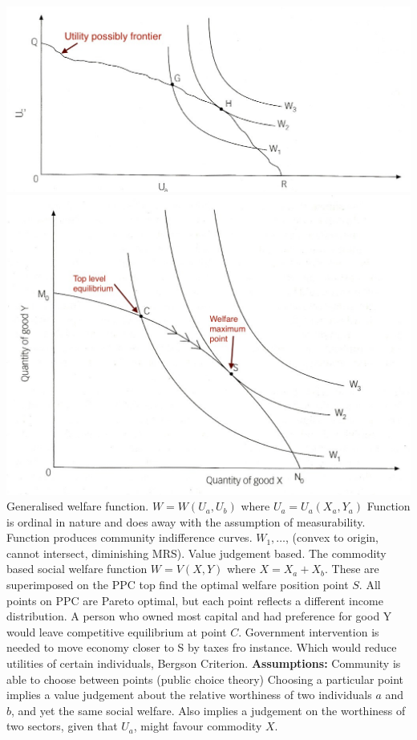 \documentclass[12pt]{examnotes}
\begin{document}
\includegraphics[scale=0.25]{./imgs/52.jpg}\includegraphics[scale=0.25]{./imgs/54.jpg}
\ra Generalised welfare function. $W=W(U_a,U_b)$ where $U_a=U_a(X_a,Y_a)$
\ra Function is ordinal in nature and does away with the assumption of measurability.
\ra Function produces community indifference curves. $W_1, \dots$, (convex to origin, cannot intersect, diminishing MRS). Value judgement based.
\ra The commodity based social welfare function $W=V(X,Y)$ where $X=X_a+X_b$. These are superimposed on the PPC top find the optimal welfare position point $S$.
\ra All points on PPC are Pareto optimal, but each point reflects a different income distribution. A person who owned most capital and had preference for good Y would leave competitive equilibrium at point $C$. 
\ra Government intervention is needed to move economy closer to S by taxes fro instance. Which would reduce utilities of certain individuals, Bergson Criterion.
{\bf Assumptions:}
\ra Community is able to choose between points (public choice theory)
\ra Choosing a particular point implies a value judgement about the relative worthiness of two individuals $a$ and $b$, and yet the same social welfare. Also implies a judgement on the worthiness of two sectors, given that $U_a$, might favour commodity $X$. 
\end{document}
